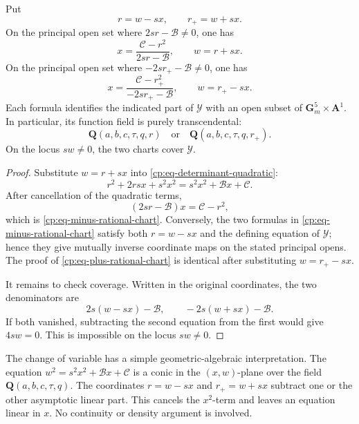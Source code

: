 \begin{proposition}
\label{cp:lem-rational-charts}
Put
\begin{equation}
 r=w-sx,\qquad r_+=w+sx.
 \label{cp:eq-rational-chart-coordinates}
\end{equation}
On the principal open set where \(2sr-\mathcal B\ne0\), one has
\begin{equation}
 x=\frac{\mathcal C-r^2}{2sr-\mathcal B},
 \qquad w=r+sx.
 \label{cp:eq-minus-rational-chart}
\end{equation}
On the principal open set where \(-2sr_+-\mathcal B\ne0\), one has
\begin{equation}
 x=\frac{\mathcal C-r_+^2}{-2sr_+-\mathcal B},
 \qquad w=r_+-sx.
 \label{cp:eq-plus-rational-chart}
\end{equation}
Each formula identifies the indicated part of \(\mathcal Y\) with an open
subset of \(\mathbf G_m^5\times\mathbf A^1\).  In particular, its function
field is purely transcendental:
\begin{equation}
 \mathbf Q(a,b,c,\tau,q,r)
 \quad\text{or}\quad
 \mathbf Q(a,b,c,\tau,q,r_+).
 \label{cp:eq-chart-function-fields}
\end{equation}
On the locus \(sw\ne0\), the two charts cover \(\mathcal Y\).
\end{proposition}

\begin{proof}
Substitute \(w=r+sx\) into
\eqref{cp:eq-determinant-quadratic}:
\[
 r^2+2rsx+s^2x^2=s^2x^2+\mathcal Bx+\mathcal C.
\]
After cancellation of the quadratic terms,
\[
 (2sr-\mathcal B)x=\mathcal C-r^2,
\]
which is \eqref{cp:eq-minus-rational-chart}.  Conversely, the two formulas
in \eqref{cp:eq-minus-rational-chart} satisfy both
\(r=w-sx\) and the defining equation of \(\mathcal Y\); hence they give
mutually inverse coordinate maps on the stated principal opens.  The proof
of \eqref{cp:eq-plus-rational-chart} is identical after substituting
\(w=r_+-sx\).

It remains to check coverage.  Written in the original coordinates, the
two denominators are
\[
 2s(w-sx)-\mathcal B,\qquad
 -2s(w+sx)-\mathcal B.
\]
If both vanished, subtracting the second equation from the first would give
\(4sw=0\).  This is impossible on the locus \(sw\ne0\).
\end{proof}

The change of variable has a simple geometric-algebraic interpretation.
The equation \(w^2=s^2x^2+\mathcal Bx+\mathcal C\) is a conic in the
\((x,w)\)-plane over the field
\(\mathbf Q(a,b,c,\tau,q)\).  The coordinates \(r=w-sx\) and
\(r_+=w+sx\) subtract one or the other asymptotic linear part.  This cancels
the \(x^2\)-term and leaves an equation linear in \(x\).  No continuity or
density argument is involved.

